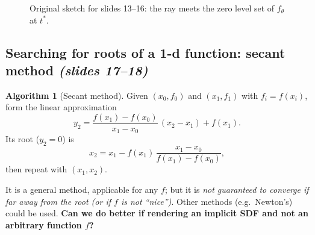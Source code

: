 \documentclass[11pt,a4paper]{article}
\newcommand{\bx}{\bm{x}}
\newcommand{\bp}{{\bm{p}}}
\newcommand{\bom}{{\bm{\omega}}}
\newcommand{\br}{{\bm{r}}}
\theoremstyle{definition}
\newtheorem{algorithm}{Algorithm}[section]
\theoremstyle{plain}
\theoremstyle{remark}
\begin{document}
\begin{figure}[htbp]
\centering
{}
\caption{Original sketch for slides 13--16: the ray meets the zero level set of $f_\theta$ at $t^*$.}
\end{figure}

\subsection{Searching for roots of a 1-d function: secant method \emph{(slides 17--18)}}
\begin{algorithm}[Secant method]\label{alg:secant}
Given $(x_0,f_0)$ and $(x_1,f_1)$ with $f_i=f(x_i)$, form the linear approximation
\[
y_2=\frac{f(x_1)-f(x_0)}{x_1-x_0}\,(x_2-x_1)+f(x_1).
\]
Its root ($y_2=0$) is
\[
x_2=x_1-f(x_1)\,\frac{x_1-x_0}{f(x_1)-f(x_0)},
\]
then repeat with $(x_1,x_2)$.
\end{algorithm}
It is a general method, applicable for any $f$; but it is \emph{not guaranteed to converge if far away from the root
(or if $f$ is not ``nice'')}. Other methods (e.g.\ Newton's) could be used. \textbf{Can we do better if rendering an
implicit SDF and not an arbitrary function $f$?}
\end{document}
